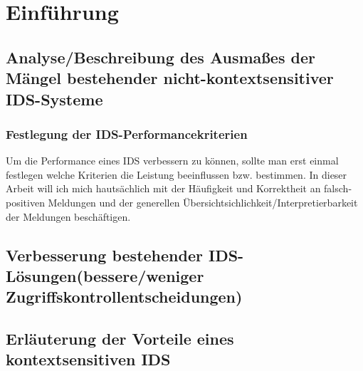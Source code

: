 
\chapter{Einführung}
\label{cha:introduction}


\section{Analyse/Beschreibung des Ausmaßes der Mängel bestehender nicht-kontextsensitiver IDS-Systeme}
\subsection{Festlegung der IDS-Performancekriterien}
Um die Performance eines IDS verbessern zu können, sollte man erst einmal festlegen welche Kriterien die Leistung beeinflussen bzw. bestimmen. In dieser Arbeit will ich mich hautsächlich mit der Häufigkeit und Korrektheit an falsch-positiven Meldungen und der generellen Übersichtsichlichkeit/Interpretierbarkeit der Meldungen beschäftigen. 
\section{Verbesserung bestehender IDS-Lösungen(bessere/weniger Zugriffskontrollentscheidungen)}   



\section{Erläuterung der Vorteile eines kontextsensitiven IDS}

